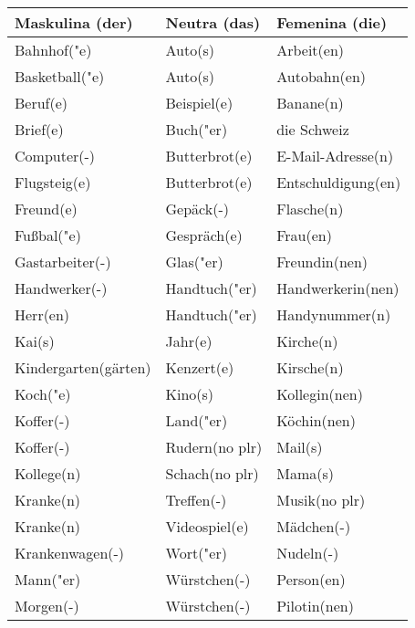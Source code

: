 \documentclass{article}
\renewcommand{\arraystretch}{1}
\begin{document}
\begin{table}[h!]
    \centering
    \label{tab:tabla1}
    \renewcommand{\arraystretch}{1.5}
    \begin{tabular}{|>{\raggedright\arraybackslash}p{5cm}|>{\raggedright\arraybackslash}p{5cm}|>{\raggedright\arraybackslash}p{5cm}|}
        \hline
        \rowcolor{gray!20} \textbf{Maskulina (der)} & \textbf{Neutra (das)} & \textbf{Femenina (die)} \\
        \hline
        Bahnhof("e) & Auto(s) & Arbeit(en) \\\hline
        Basketball("e) & Auto(s) & Autobahn(en) \\\hline
        Beruf(e) & Beispiel(e) & Banane(n) \\\hline
        Brief(e) & Buch("er) & die Schweiz \\\hline
        Computer(-) & Butterbrot(e) & E-Mail-Adresse(n) \\\hline
        Flugsteig(e) & Butterbrot(e) & Entschuldigung(en) \\\hline
        Freund(e) & Gepäck(-) & Flasche(n) \\\hline
        Fu\ss{}bal("e) & Gespräch(e) & Frau(en) \\\hline
        Gastarbeiter(-) & Glas("er) & Freundin(nen) \\\hline
        Handwerker(-) & Handtuch("er) & Handwerkerin(nen) \\\hline
        Herr(en) & Handtuch("er) & Handynummer(n) \\\hline
        Kai(s) & Jahr(e) & Kirche(n) \\\hline
        Kindergarten(gärten) & Kenzert(e) & Kirsche(n) \\\hline
        Koch("e) & Kino(s) & Kollegin(nen) \\\hline
        Koffer(-) & Land("er) & Köchin(nen) \\\hline
        Koffer(-) & Rudern(no plr) & Mail(s) \\\hline
        Kollege(n) & Schach(no plr) & Mama(s) \\\hline
        Kranke(n) & Treffen(-) & Musik(no plr) \\\hline
        Kranke(n) & Videospiel(e) & Mädchen(-) \\\hline
        Krankenwagen(-) & Wort("er) & Nudeln(-) \\\hline
        Mann("er) & Würstchen(-) & Person(en) \\\hline
        Morgen(-) & Würstchen(-) & Pilotin(nen) \\\hline

\end{tabular}
\end{table}
\end{document}
